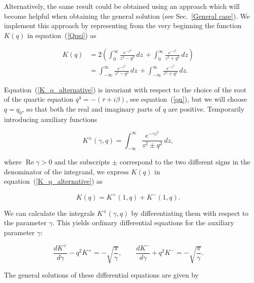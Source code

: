 \documentclass[draft]{agujournal2019}
\begin{document}
Alternatively, the same result could be obtained using an approach which will 
become helpful when obtaining the general solution (see Sec.~\ref{General case}).
We implement this approach by representing from the very beginning the function $K(q)$ in equation~(\ref{Qpsi}) as
\begin{linenomath*}
\begin{align}
K(q)  & =2\left(  \int_{0}^{\infty}\frac{e^{-z^{2}}}{z^{2}-q^{2}}
\,dz\,+\int_{0}^{\infty}\frac{e^{-z^{2}}}{z^{2}+q^{2}}\,dz\right)
\nonumber\\
& =\int_{-\infty}^{\infty}\frac{e^{-z^{2}}}{z^{2}-q^{2}}\,dz\,+\int_{-\infty
}^{\infty}\frac{e^{-z^{2}}}{z^{2}+q^{2}}\,dz.
\label{K_q_alternative}
\end{align}
\end{linenomath*}
Equation~(\ref{K_q_alternative}) is invariant with respect to the choice of the root of the 
quartic equation $q^{4}=-(\tau+i\beta)$, see equation~(\ref{qn}), but we will choose $q=q_{0}$, so that both the
real and imaginary parts of $q$ are positive.
Temporarily introducing auxiliary functions 
\begin{linenomath*}
\begin{equation}
K^{\pm}(\gamma,q)=\int_{-\infty}^{\infty}\frac{e^{-\gamma z^{2}}}{z^{2}\pm
q^{2}}\,dz,
\label{K^+-}
\end{equation}
\end{linenomath*}
where  $\operatorname{Re}\gamma>0$ and the subscripts $\pm$ correspond to the two different signs in the
denominator of the integrand, we express $K(q)$ in
equation~(\ref{K_q_alternative}) as
\begin{linenomath*}
\begin{equation}
K(q)=K^{+}(1,q)+K^{-}(1,q).\label{via_K+-}
\end{equation}
\end{linenomath*}
We can calculate the integrals $K^{\pm}(\gamma,q)$ by differentiating them
with respect to the parameter $\gamma$. This yields ordinary
differential equations for the auxiliary parameter $\gamma$:
\begin{linenomath*}
\begin{equation}
\frac{dK^{+}}{d\gamma}-q^{2}K^{+}=-\sqrt{\frac{\pi}{\gamma}},\qquad
\frac{dK^{-}}{d\gamma}+q^{2}K^{-}=-\sqrt{\frac{\pi}{\gamma}}.\label{K_diffury}%
\end{equation}
\end{linenomath*}
The general solutions of these differential equations are given by
\end{document}
